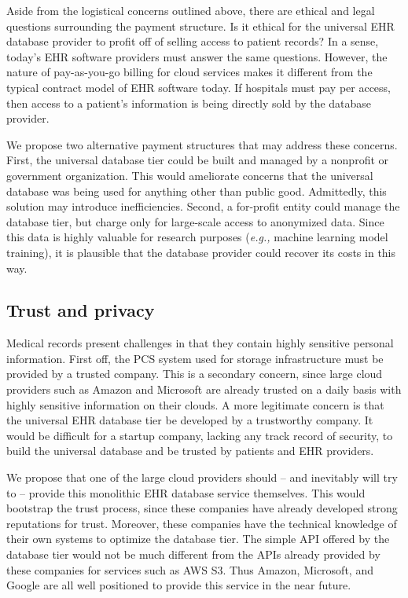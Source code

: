 Aside from the logistical concerns outlined above, there are ethical and legal questions surrounding the payment structure. Is it ethical for the universal EHR database provider to profit off of selling access to patient records? In a sense, today's EHR software providers must answer the same questions. However, the nature of pay-as-you-go billing for cloud services makes it different from the typical contract model of EHR software today. If hospitals must pay per access, then access to a patient's information is being directly sold by the database provider.

We propose two alternative payment structures that may address these concerns. First, the universal database tier could be built and managed by a nonprofit or government organization. This would ameliorate concerns that the universal database was being used for anything other than public good. Admittedly, this solution may introduce inefficiencies. Second, a for-profit entity could manage the database tier, but charge only for large-scale access to anonymized data. Since this data is highly valuable for research purposes (\textit{e.g.,} machine learning model training), it is plausible that the database provider could recover its costs in this way.

\subsection{Trust and privacy}
Medical records present challenges in that they contain highly sensitive personal information. First off, the PCS system used for storage infrastructure must be provided by a trusted company. This is a secondary concern, since large cloud providers such as Amazon and Microsoft are already trusted on a daily basis with highly sensitive information on their clouds. A more legitimate concern is that the universal EHR database tier be developed by a trustworthy company. It would be difficult for a startup company, lacking any track record of security, to build the universal database and be trusted by patients and EHR providers.

We propose that one of the large cloud providers should -- and inevitably will try to -- provide this monolithic EHR database service themselves. This would bootstrap the trust process, since these companies have already developed strong reputations for trust. Moreover, these companies have the technical knowledge of their own systems to optimize the database tier. The simple API offered by the database tier would not be much different from the APIs already provided by these companies for services such as AWS S3. Thus Amazon, Microsoft, and Google are all well positioned to provide this service in the near future.

